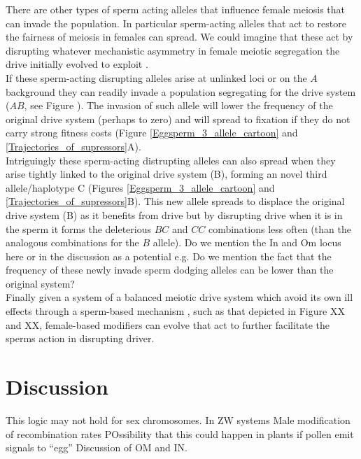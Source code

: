 \documentclass[12pt,letterpaper]{article}
\newcommand{\gc}[1]{{ \color{red} #1}}
\begin{document}
There are other types of sperm acting alleles that influence
female meiosis that can invade the population. 
In particular sperm-acting alleles that act to restore 
the fairness of meiosis in females can spread. 
We could imagine that these act by 
disrupting whatever mechanistic asymmetry in female meiotic segregation the
drive initially evolved to exploit \citep{Pardo-ManuelDeVillena2001a}.\\

If these sperm-acting disrupting alleles arise at unlinked loci or on
the $A$ background they can readily invade a population segregating
for the drive system ($AB$, see Figure ). The invasion of such allele
will lower the frequency of the original drive system (perhaps to zero)
and will spread to fixation if they do not carry strong fitness costs
(Figure \ref{Eggsperm_3_allele_cartoon} and \ref{Trajectories_of_supressors}A). \\


Intriguingly these sperm-acting distrupting alleles can also spread
when they arise tightly linked to the original drive system (B), forming
an novel third allele/haplotype C (Figures \ref{Eggsperm_3_allele_cartoon} and \ref{Trajectories_of_supressors}B). This new allele spreads
to displace the original drive system (B) as it benefits from drive
but by disrupting drive when it is in the sperm it forms
 the deleterious $BC$ and $CC$ combinations less often (than the
 analogous combinations for the $B$ allele). 
\gc{Do we mention the In and Om locus here or in the discussion as a
  potential e.g. Do we mention the fact that the frequency of these
  newly invade sperm dodging alleles can be lower than the original system?}\\

Finally given a system of a balanced meiotic drive system which avoid
its own ill effects through a sperm-based mechanism
, such as that depicted in Figure XX and XX, female-based modifiers 
can evolve that act to further facilitate the sperms action in
disrupting driver.

\section*{Discussion}


This logic may not hold for sex chromosomes. In ZW systems 
 Male modification of recombination rates
POssibility that this could happen in plants if pollen emit signals to ``egg''
Discussion of OM and IN.
\end{document}
